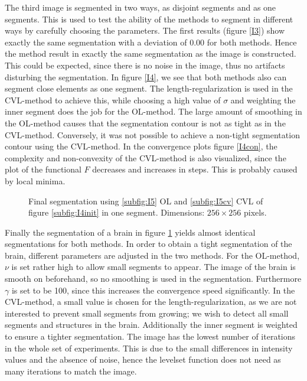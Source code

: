 The third image is segmented in two ways, as disjoint segments and as one segments. This is used to test the ability of the methods to segment in different ways by carefully choosing the parameters. The first results (figure \ref{I3}) show exactly the same segmentation with a deviation of $0.00$ for both methods. Hence the method result in exactly the same segmentation as the image is constructed. This could be expected, since there is no noise in the image, thus no artifacts disturbing the segmentation. In figure \ref{I4}, we see that both methods also can segment close elements as one segment. The length-regularization is used in the CVL-method to achieve this, while choosing a high value of $\sigma$ and weighting the inner segment does the job for the OL-method. The large amount of smoothing in the OL-method causes that the segmentation contour is not as tight as in the CVL-method. Conversely, it was not possible to achieve a non-tight segmentation contour using the CVL-method. In the convergence plots figure \ref{I4con}, the complexity and non-convexity of the CVL-method is also visualized, since the plot of the functional $F$ decreases and increases in steps. This is probably caused by local minima.\\

\begin{figure}[h]
  \centering
  \caption{Final segmentation using \ref{subfig:I5} OL and \ref{subfig:I5cv} CVL of figure \ref{subfig:I4init} in one segment. Dimensions: $256\times 256$ pixels.}\label{I5}
\end{figure}

Finally the segmentation of a brain in figure \ref{I5} yields almost identical segmentations for both methods. In order to obtain a tight segmentation of the brain, different parameters are adjusted in the two methods. For the OL-method, $\nu$ is set rather high to allow small segments to appear. The image of the brain is smooth on beforehand, so no smoothing is used in the segmentation. Furthermore $\gamma$ is set to be 100, since this increases the convergence speed significantly. In the CVL-method, a small value is chosen for the length-regularization, as we are not interested to prevent small segments from growing; we wish to detect all small segments and structures in the brain. Additionally the inner segment is weighted to ensure a tighter segmentation. The image has the lowest number of iterations in the whole set of experiments. This is due to the small differences in intensity values and the absence of noise, hence the levelset function does not need as many iterations to match the image.\\

